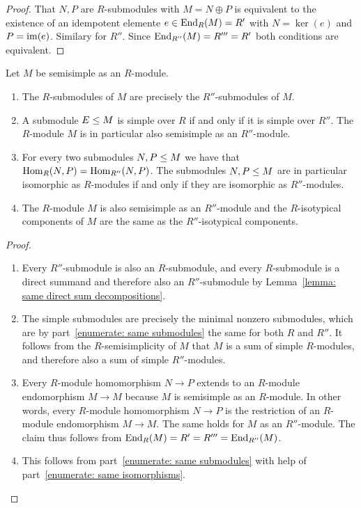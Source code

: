 \begin{proof}
  That $N, P$ are $R$-submodules with $M = N \oplus P$ is equivalent to the existence of an idempotent elemente $e \in \operatorname{End}_R(M) = R'$ with $N = \ker(e)$ and $P = \operatorname{im}(e)$.
  Similary for $R''$.
  Since $\operatorname{End}_{R''}(M) = R''' = R'$ both conditions are equivalent.
\end{proof}


\begin{proposition}
  Let $M$ be semisimple as an $R$-module.
  \begin{enumerate}
    \item
      \label{enumerate: same submodules}
      The $R$-submodules of $M$ are precisely the $R''$-submodules of $M$.
    \item
      A submodule $E \leq M$ is simple over $R$ if and only if it is simple over $R''$.
      The $R$-module $M$ is in particular also semisimple as an $R''$-module.
    \item
      \label{enumerate: same isomorphisms}
      For every two submodules $N, P \leq M$ we have that $\operatorname{Hom}_R(N,P) = \operatorname{Hom}_{R''}(N,P)$.
      The submodules $N, P \leq M$ are in particular isomorphic as $R$-modules if and only if they are isomorphic as $R''$-modules.
    \item
      The $R$-module $M$ is also semisimple as an $R''$-module and the $R$-isotypical components of $M$ are the same as the $R''$-isotypical components.
  \end{enumerate}
\end{proposition}


\begin{proof}
  \leavevmode
  \begin{enumerate}
    \item
      Every $R''$-submodule is also an $R$-submodule, and every $R$-submodule is a direct summand and therefore also an $R''$-submodule by Lemma~\ref{lemma: same direct sum decompositions}.
    \item
      The simple submodules are precisely the minimal nonzero submodules, which are by part~\ref*{enumerate: same submodules} the same for both $R$ and $R''$.
      It follows from the $R$-semisimplicity of $M$ that $M$ is a sum of simple $R$-modules, and therefore also a sum of simple $R''$-modules.
    \item
      Every $R$-module homomorphism $N \to P$ extends to an $R$-module endomorphism $M \to M$ because $M$ is semisimple as an $R$-module.
      In other words, every $R$-module homomorphism $N \to P$ is the restriction of an $R$-module endomorphism $M \to M$.
      The same holds for $M$ as an $R''$-module.
      The claim thus follows from $\operatorname{End}_R(M) = R' = R''' = \operatorname{End}_{R''}(M)$.
    \item
      This follows from part~\ref*{enumerate: same submodules} with help of part~\ref*{enumerate: same isomorphisms}.
    \qedhere
  \end{enumerate}
\end{proof}





